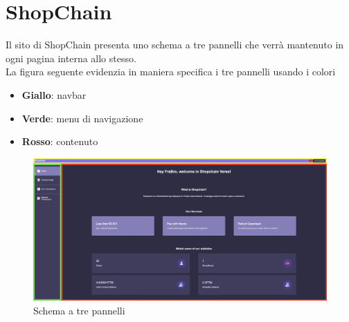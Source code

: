 \section{ShopChain}
Il sito di ShopChain presenta uno schema a tre pannelli che verrà mantenuto in ogni pagina interna allo stesso.\\
La figura seguente evidenzia in maniera specifica i tre pannelli usando i colori
\begin{itemize}
    \item \textbf{Giallo}: navbar
    \item \textbf{Verde}: menu di navigazione
    \item \textbf{Rosso}: contenuto
\end{itemize}
\begin{figure}[H]
    \centering
    \includegraphics[scale=0.2]{immagini/trePannelli.png}
    \caption{Schema a tre pannelli}
\end{figure}


